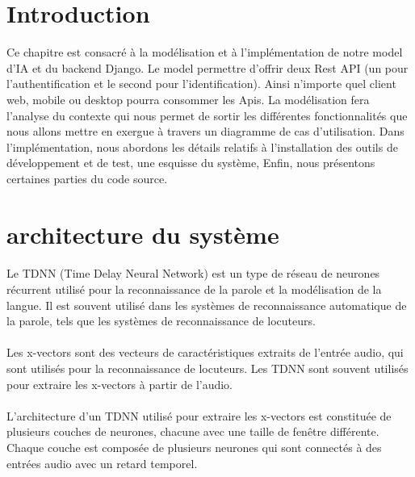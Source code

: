 \section*{Introduction}
Ce chapitre est consacré à la modélisation et à l’implémentation de notre model d’IA et du backend Django.  Le model permettre d’offrir deux Rest API (un pour l’authentification et le second pour l’identification). Ainsi n’importe quel client web, mobile ou desktop pourra consommer les Apis.  La modélisation fera l’analyse du contexte qui nous permet de sortir les différentes fonctionnalités que nous allons mettre en exergue à travers un diagramme de cas d’utilisation. Dans l’implémentation, nous abordons les détails relatifs à l’installation des outils de développement et de test, une esquisse du système, Enfin, nous présentons certaines parties du code source.   
\section{architecture du système}
\paragraph{}Le TDNN (Time Delay Neural Network) est un type de réseau de neurones récurrent utilisé pour la reconnaissance de la parole et la modélisation de la langue. Il est souvent utilisé dans les systèmes de reconnaissance automatique de la parole, tels que les systèmes de reconnaissance de locuteurs.
\paragraph{}Les x-vectors sont des vecteurs de caractéristiques extraits de l'entrée audio, qui sont utilisés pour la reconnaissance de locuteurs. Les TDNN sont souvent utilisés pour extraire les x-vectors à partir de l'audio.
\paragraph{}L'architecture d'un TDNN utilisé pour extraire les x-vectors est constituée de plusieurs couches de neurones, chacune avec une taille de fenêtre différente. Chaque couche est composée de plusieurs neurones qui sont connectés à des entrées audio avec un retard temporel.
